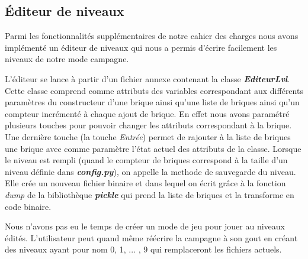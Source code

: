  \subsection{Éditeur de niveaux}
  
      Parmi les fonctionnalités supplémentaires de notre cahier des charges nous avons implémenté un éditeur de niveaux qui nous a permis d'écrire facilement les niveaux de notre mode campagne.

    L'éditeur se lance à partir d'un fichier annexe contenant la classe {\bf \em EditeurLvl}. Cette classe comprend comme attributs des variables correspondant aux différents paramètres du constructeur d'une brique ainsi qu'une liste de briques ainsi qu'un compteur incrémenté à chaque ajout de brique. En effet nous avons paramétré plusieurs touches pour pouvoir changer les attributs correspondant à la brique. Une dernière touche (la touche {\em Entrée}) permet de rajouter à la liste de briques une brique avec comme paramètre l'état actuel des attributs de la classe. Lorsque le niveau est rempli (quand le compteur de briques correspond à la taille d'un niveau définie dans {\bf \em config.py}), on appelle la methode de sauvegarde du niveau. Elle crée un nouveau fichier binaire et dans lequel on écrit grâce à la fonction {\em dump} de la bibliothèque {\bf \em pickle} qui prend la liste de briques et la transforme en code binaire.

    Nous  n'avons pas eu le temps de créer un mode de jeu pour jouer au niveaux édités. L'utilisateur peut quand même réécrire la campagne à son gout en  créant des niveaux ayant pour nom 0, 1, ... , 9 qui remplaceront les  fichiers actuels.
